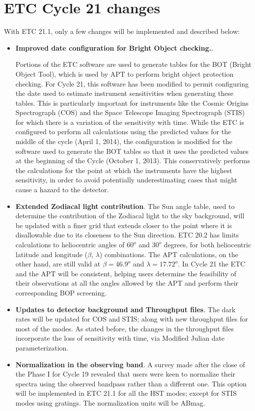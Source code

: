 \documentclass[11pt,twoside]{article}
\begin{document}
\section{ETC Cycle 21 changes}

With ETC 21.1, only a few changes will be implemented and described below:

\begin{itemize}
\item {\bf{ Improved date configuration for Bright Object checking.}}.

Portions of the ETC software are used to generate tables for
the BOT (Bright Object Tool),
which is used by APT to perform bright object protection
checking. For Cycle
21, this software has been modified to permit configuring
the date used to estimate
instrument sensitivities when generating these tables.  This
is particularly important for
instruments like the Cosmic Origins Spectrograph (COS) and
the Space Telescope
Imaging Spectrograph (STIS) for which there is a variation
of the sensitivity
with time. While the ETC is configured to perform all
calculations using the predicted
values for the middle of the cycle (April 1, 2014), the
configuration is modified for
the software used to generate the BOT tables so that it uses
the predicted values at
the beginning of the Cycle (October 1, 2013). This
conservatively performs the calculations
for the point at which the instruments have the highest
sensitivity, in order to avoid potentially
underestimating cases that might cause a hazard to the detector.

\item {\bf { Extended Zodiacal light contribution}}.
The Sun angle table, used to determine the contribution of the  Zodiacal light 
to the sky background, will be updated with a finer grid that extends closer to  the point where 
it is disallowable due to its closeness to the Sun direction. ETC 20.2 has limits calculations to heliocentric
angles of $60^o$ and $30^o$ degrees, for both heliocentric latitude and longitude ($\beta$, $\lambda$)
combinations.  The APT calculations, on the other hand, are still valid at  $\beta = 46.9^o$ and
$\lambda = 17.72^o$. In Cycle 21  the ETC and the APT will
be consistent, helping users determine the feasibility of their observations at all the angles allowed
by the APT and perform their corresponding BOP screening.

\item {\bf Updates to detector background and Throughput files}.
The dark rates will be updated for COS and STIS;
 along with new  throughput files for most of the
modes. As stated before, the changes in the throughput files incorporate the loss of sensitivity with
time, via Modified Julian date parameterization.

\item {\bf Normalization in the observing band}.
A survey made after the close of the Phase I for Cycle 19 revealed that users were
keen to normalize their spectra using the observed bandpass rather than a different one.
This option will be implemented in ETC 21.1 for all the HST modes; except for STIS modes using
gratings. The normalization units will be ABmag.


\end{itemize}
\end{document}
